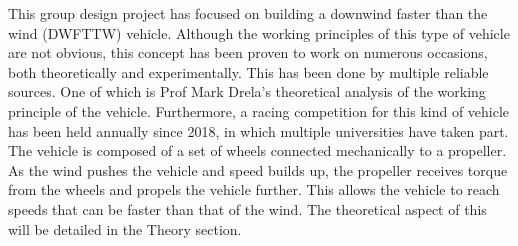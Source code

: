 This group design project has focused on building a downwind faster than the wind (DWFTTW) vehicle. Although the working principles of this type of vehicle are not obvious, this concept has been proven to work on numerous occasions, both theoretically and experimentally. This has been done by multiple reliable sources. One of which is Prof Mark Drela's theoretical analysis of the working principle of the vehicle. Furthermore, a racing competition for this kind of vehicle has been held annually since 2018, in which multiple universities have taken part. The vehicle is composed of a set of wheels connected mechanically to a propeller. As the wind pushes the vehicle and speed builds up, the propeller receives torque from the wheels and propels the vehicle further. This allows the vehicle to reach speeds that can be faster than that of the wind. The theoretical aspect of this will be detailed in the Theory section.